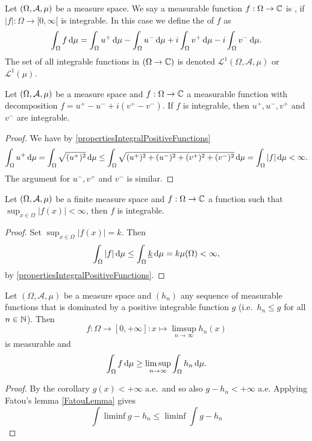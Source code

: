 \begin{definition}
Let $\left( \Omega, \mathcal{A},\mu \right)$ be a measure space. We say a measurable function $f: \Omega \to \mathbb{C}$ is , if $|f|:\Omega\to [0,\infty[$ is integrable. In this case we define the  of $f$ as
\[ \int_\Omega f\operatorname{d \!}{\mu} = \int_\Omega u^+\operatorname{d \!}{\mu} - \int_\Omega u^-\operatorname{d \!}{\mu} + i\int_\Omega v^+\operatorname{d \!}{\mu} - i\int_\Omega v^-\operatorname{d \!}{\mu}. \]
The set of all integrable functions in $(\Omega \to \mathbb{C})$ is denoted $\mathcal{L} ^1(\Omega,\mathcal{A},\mu)$ or $\mathcal{L} ^1(\mu)$.
\end{definition}

\begin{lemma}
Let $\left( \Omega, \mathcal{A},\mu \right)$ be a measure space and $f: \Omega \to \mathbb{C}$ a measurable function with decomposition $f = u^+ - u^- + i(v^+ -v^-)$. If $f$ is integrable, then $u^+, u^-, v^+$ and $v^-$ are integrable.
\end{lemma}
\begin{proof}
We have by \ref{propertiesIntegralPositiveFunctions}
\[ \int_\Omega u^+ \operatorname{d \!}{\mu} = \int_\Omega \sqrt{(u^+)^2} \operatorname{d \!}{\mu} \leq \int_\Omega \sqrt{(u^+)^2+ (u^-)^2 + (v^+)^2 + (v^-)^2} \operatorname{d \!}{\mu} = \int_\Omega|f|\operatorname{d \!}{\mu} < \infty. \]
The argument for $u^-,v^+$ and $v^-$ is similar.
\end{proof}

\begin{lemma} \label{finiteMeasureBoundedFunctionMeasurable}
Let $\left( \Omega, \mathcal{A},\mu \right)$ be a finite measure space and $f: \Omega \to \mathbb{C}$ a function such that $\sup_{x\in \Omega}|f(x)|<\infty$, then $f$ is integrable.
\end{lemma}
\begin{proof}
Set $\sup_{x\in \Omega}|f(x)| = k$. Then
\[ \int_\Omega |f|\operatorname{d \!}{\mu} \leq \int_\Omega \underline{k}\operatorname{d \!}{\mu} = k\mu(\Omega) < \infty, \]
by \ref{propertiesIntegralPositiveFunctions}.
\end{proof}


\begin{proposition}
Let $(\Omega, \mathcal{A}, \mu)$ be a measure space and $(h_n)$ any sequence of measurable functions that is dominated by a positive integrable function $g$ (i.e.\ $h_n\leq g$ for all $n\in\mathbb{N}$). Then
\[ f: \Omega\to[0,+\infty]: x\mapsto \limsup_{n\to\infty}h_n(x) \]
is measurable and
\[ \int_\Omega f\operatorname{d \!}{\mu} \geq \limsup_{n\to\infty}\int_\Omega h_n\operatorname{d \!}{\mu}. \]
\end{proposition}
\begin{proof}
By the corollary $g(x)<+\infty$ a.e.\ and so also $g-h_n<+\infty$ a.e. Applying Fatou's lemma \ref{FatouLemma} gives
\[ \int\liminf g-h_n \leq \liminf\int g-h_n\]
\end{proof}

